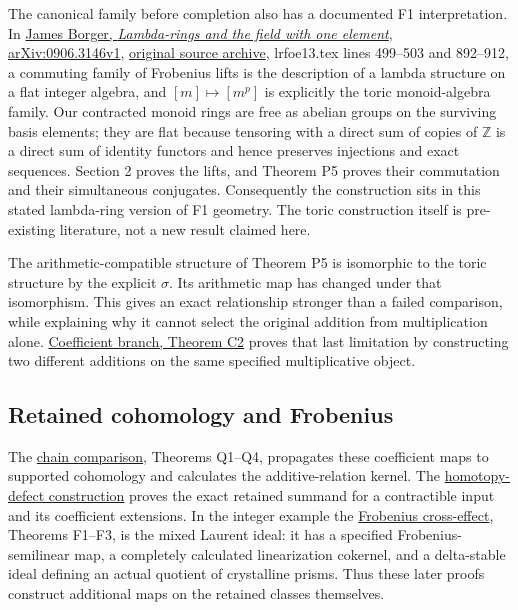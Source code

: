 \documentclass[
]{article}
\begin{document}
The canonical family before completion also has a documented F1
interpretation. In \href{https://arxiv.org/abs/0906.3146v1}{James
Borger, \emph{Lambda-rings and the field with one element},
arXiv:0906.3146v1}, \href{https://arxiv.org/src/0906.3146v1}{original
source archive}, lrfoe13.tex lines 499--503 and 892--912, a commuting
family of Frobenius lifts is the description of a lambda structure on a
flat integer algebra, and \([m]\mapsto[m^p]\) is explicitly the toric
monoid-algebra family. Our contracted monoid rings are free as abelian
groups on the surviving basis elements; they are flat because tensoring
with a direct sum of copies of \(\mathbb Z\) is a direct sum of identity
functors and hence preserves injections and exact sequences. Section 2
proves the lifts, and Theorem P5 proves their commutation and their
simultaneous conjugates. Consequently the construction sits in this
stated lambda-ring version of F1 geometry. The toric construction itself
is pre-existing literature, not a new result claimed here.

The arithmetic-compatible structure of Theorem P5 is isomorphic to the
toric structure by the explicit \(\sigma\). Its arithmetic map has
changed under that isomorphism. This gives an exact relationship
stronger than a failed comparison, while explaining why it cannot select
the original addition from multiplication alone.
\href{https://github.com/KokunoYumeto/zeta-function-research-reader/blob/6af54ea3c8ef99127af327f3103e086c68d482c2/workbenches/splitzero-tandem/branches/identity-absorber-square/COEFFICIENT_BRANCH.md}{Coefficient
branch, Theorem C2} proves that last limitation by constructing two
different additions on the same specified multiplicative object.

\subsection{Retained cohomology and
Frobenius}\label{retained-cohomology-and-frobenius-1}

The
\href{https://github.com/KokunoYumeto/zeta-function-research-reader/blob/6af54ea3c8ef99127af327f3103e086c68d482c2/workbenches/splitzero-tandem/branches/identity-absorber-square/CHAIN_COMPARISON.md}{chain
comparison}, Theorems Q1--Q4, propagates these coefficient maps to
supported cohomology and calculates the additive-relation kernel. The
\href{https://github.com/KokunoYumeto/zeta-function-research-reader/blob/6af54ea3c8ef99127af327f3103e086c68d482c2/workbenches/splitzero-tandem/branches/identity-absorber-square/HOMOTOPY_DEFECT.md}{homotopy-defect
construction} proves the exact retained summand for a contractible input
and its coefficient extensions. In the integer example the
\href{https://github.com/KokunoYumeto/zeta-function-research-reader/blob/6af54ea3c8ef99127af327f3103e086c68d482c2/workbenches/splitzero-tandem/branches/identity-absorber-square/FROBENIUS_CROSS_EFFECT.md}{Frobenius
cross-effect}, Theorems F1--F3, is the mixed Laurent ideal: it has a
specified Frobenius-semilinear map, a completely calculated
linearization cokernel, and a delta-stable ideal defining an actual
quotient of crystalline prisms. Thus these later proofs construct
additional maps on the retained classes themselves.
\end{document}
